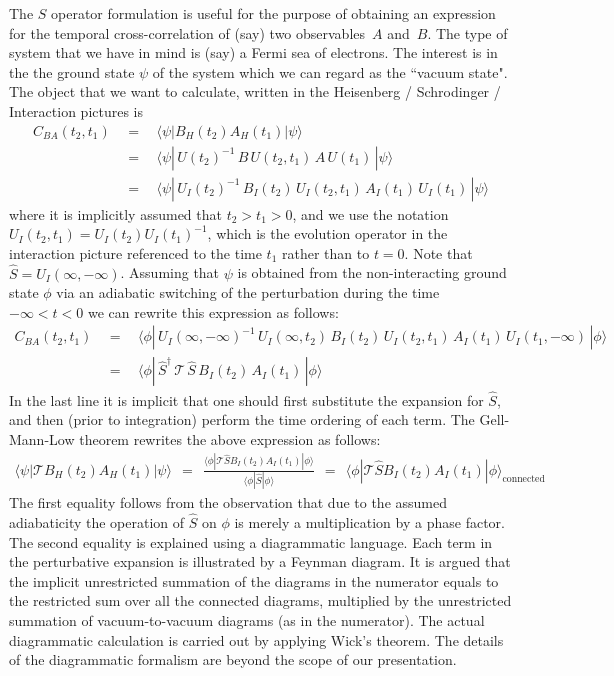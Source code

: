 \documentclass[onecolumn,fleqn, 11pt]{revtex4}
\newcommand{\tbox}[1]{\text{#1}}
\newcommand{\beq}{\begin{eqnarray}}
\newcommand{\eeq}{\end{eqnarray}}
\begin{document}
The $S$ operator formulation is useful 
for the purpose of obtaining an expression for 
the temporal cross-correlation of (say) two observables~$A$ and~$B$.
The type of system that we have in mind is (say) a Fermi sea 
of electrons. The interest is in the the ground state $\psi$   
of the system which we can regard as the ``vacuum state". 
The object that we want to calculate, written in the 
Heisenberg / Schrodinger / Interaction pictures is   
\beq
C_{BA}(t_2,t_1) 
& \ \ = \ \ & 
\langle\psi|B_H(t_2)A_H(t_1)|\psi\rangle 
\\
& \ \ = \ \ &
\langle\psi| \, U(t_2)^{-1} \, B \, U(t_2,t_1) \, A \, U(t_1) \, |\psi\rangle 
\\
& \ \ = \ \ &
\langle\psi| \, U_I(t_2)^{-1} \, B_I(t_2) \, U_I(t_2,t_1) \, A_I(t_1) \, U_I(t_1) \, |\psi\rangle 
\eeq
where it is implicitly assumed that ${t_2 > t_1 > 0}$, 
and we use the notation ${U_I(t_2,t_1)=U_I(t_2)U_I(t_1)^{-1}}$, 
which is the evolution operator  in the interaction picture
referenced to the time $t_1$ rather than to $t{=}0$. 
Note that ${\hat{S}=U_I(\infty,-\infty)}$.
Assuming that $\psi$ is obtained from the non-interacting 
ground state $\phi$ via an adiabatic switching 
of the perturbation during the time ${-\infty < t < 0}$ 
we can rewrite this expression as follows:   
\beq
C_{BA}(t_2,t_1) 
& \ \ = \ \ &
\langle\phi| \, U_I(\infty,-\infty)^{-1} \, U_I(\infty,t_2)   \, B_I(t_2) \, U_I(t_2,t_1) \, A_I(t_1) \, U_I(t_1,-\infty) \, |\phi\rangle
\\
& \ \ = \ \ &
\langle\phi| \, \hat{S}^{\dag} \, \mathcal{T} \, \hat{S} \, B_I(t_2) \, A_I(t_1) \, |\phi\rangle 
\eeq
In the last line it is implicit that 
one should first substitute the expansion for $\hat{S}$,  
and then (prior to integration) perform 
the time ordering of each term.
The Gell-Mann-Low theorem rewrites the 
above expression as follows:  
\beq
\langle\psi|\mathcal{T}B_H(t_2)A_H(t_1)|\psi\rangle 
\ \ = \ \ 
\frac{\langle\phi|\mathcal{T} \hat{S} B_I(t_2) A_I(t_1) |\phi\rangle} 
{\langle\phi| \hat{S} |\phi\rangle} 
\ \ = \ \ 
\langle\phi|\mathcal{T} \hat{S} B_I(t_2) A_I(t_1) |\phi\rangle_{\tbox{connected}}
\eeq
The first equality follows from the observation 
that due to the assumed adiabaticity 
the operation of $\hat{S}$ on $\phi$ 
is merely a multiplication by a phase factor. 
The second equality is explained using a diagrammatic   
language. Each term in the perturbative expansion 
is illustrated by a Feynman diagram. 
It is argued that the implicit unrestricted summation 
of the diagrams in the numerator equals to 
the restricted sum over all the connected diagrams, 
multiplied by the unrestricted summation of 
vacuum-to-vacuum diagrams (as in the numerator). 
The actual diagrammatic calculation is carried out 
by applying Wick's theorem. The details of the 
diagrammatic formalism are beyond the scope of our presentation.  
\end{document}
